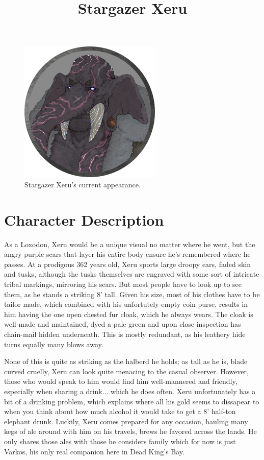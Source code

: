 \documentclass[12pt]{article}
\begin{document}
 
\title{Stargazer Xeru}
\date{}

\maketitle
\begin{figure}[!htb]
  \centering
  \includegraphics[width=.7\textwidth]{./resources/Stargazer_Xeru}
  \caption{Stargazer Xeru's current appearance.}
\end{figure}

\clearpage

\section{Character Description}

As a Loxodon, Xeru would be a unique visual no matter where he went, but the
angry purple scars that layer his entire body ensure he's remembered where he
passes. At a prodigous 362 years old, Xeru sports large droopy ears, faded skin
and tusks, although the tusks themselves are engraved with some sort of
intricate tribal markings, mirroring his scars. But most people have to look up
to see them, as he stands a striking 8' tall. Given his size, most of his
clothes have to be tailor made, which combined with his unfortutely empty coin
purse, results in him having the one open chested fur cloak, which he always
wears. The cloak is well-made and maintained, dyed a pale green and upon close
inspection has chain-mail hidden underneath. This is mostly redundant, as his
leathery hide turns equally many blows away.

None of this is quite as striking as the halberd he holds; as tall as he is,
blade curved cruelly, Xeru can look quite menacing to the casual observer.
However, those who would speak to him would find him well-mannered and friendly,
especially when sharing a drink... which he does often. Xeru unfortunately has
a bit of a drinking problem, which explains where all his gold seems to
dissapear to when you think about how much alcohol it would take to get a 8'
half-ton elephant drunk. Luckily, Xeru comes prepared for any occasion, hauling
many kegs of ale around with him on his travels, brews he favored across the
lands. He only shares those ales with those he considers family which for now
is just Varkos, his only real companion here in Dead King's Bay.
\end{document}

